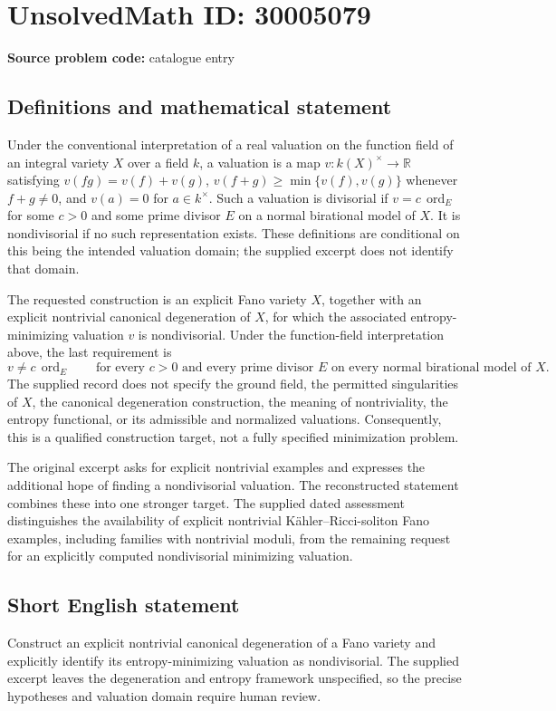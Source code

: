 \documentclass[11pt]{article}
\newcommand{\R}{\mathbb{R}}
\begin{document}
\section*{UnsolvedMath ID: 30005079}
\textbf{Source problem code:} catalogue entry
\subsection{Definitions and mathematical statement}
Under the conventional interpretation of a real valuation on the function field of an integral variety \(X\) over a field \(k\), a valuation is a map \(v:k(X)^\times\to\R\) satisfying \(v(fg)=v(f)+v(g)\), \(v(f+g)\geq\min\{v(f),v(g)\}\) whenever \(f+g\neq0\), and \(v(a)=0\) for \(a\in k^\times\). Such a valuation is divisorial if \(v=c\,\operatorname{ord}_E\) for some \(c>0\) and some prime divisor \(E\) on a normal birational model of \(X\). It is nondivisorial if no such representation exists. These definitions are conditional on this being the intended valuation domain; the supplied excerpt does not identify that domain.

The requested construction is an explicit Fano variety \(X\), together with an explicit nontrivial canonical degeneration of \(X\), for which the associated entropy-minimizing valuation \(v\) is nondivisorial. Under the function-field interpretation above, the last requirement is
\[
 v\neq c\,\operatorname{ord}_E
 \qquad\text{for every }c>0\text{ and every prime divisor }E
 \text{ on every normal birational model of }X.
\]
The supplied record does not specify the ground field, the permitted singularities of \(X\), the canonical degeneration construction, the meaning of nontriviality, the entropy functional, or its admissible and normalized valuations. Consequently, this is a qualified construction target, not a fully specified minimization problem.

The original excerpt asks for explicit nontrivial examples and expresses the additional hope of finding a nondivisorial valuation. The reconstructed statement combines these into one stronger target. The supplied dated assessment distinguishes the availability of explicit nontrivial K\"ahler--Ricci-soliton Fano examples, including families with nontrivial moduli, from the remaining request for an explicitly computed nondivisorial minimizing valuation.
\subsection{Short English statement}
Construct an explicit nontrivial canonical degeneration of a Fano variety and explicitly identify its entropy-minimizing valuation as nondivisorial. The supplied excerpt leaves the degeneration and entropy framework unspecified, so the precise hypotheses and valuation domain require human review.
\end{document}
